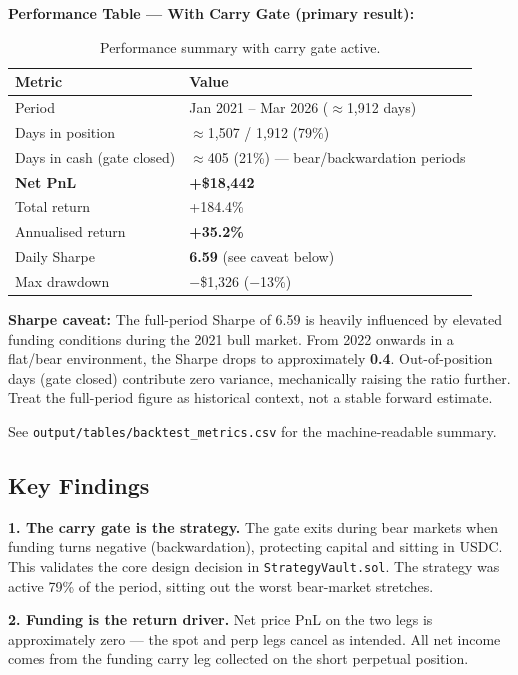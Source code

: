 \documentclass[11pt,a4paper]{article}
\begin{document}
\textbf{Performance Table --- With Carry Gate (primary result):}

\begin{table}[h!]
\centering
\caption{Performance summary with carry gate active.}
\begin{tabular}{@{}ll@{}}
\toprule
\textbf{Metric} & \textbf{Value} \\
\midrule
Period                       & Jan 2021 -- Mar 2026 ($\approx$1,912 days) \\
Days in position             & $\approx$1,507 / 1,912 (79\%) \\
Days in cash (gate closed)   & $\approx$405 (21\%) --- bear/backwardation periods \\
\textbf{Net PnL}             & \textbf{+\$18,442} \\
Total return                 & +184.4\% \\
Annualised return            & \textbf{+35.2\%} \\
Daily Sharpe                 & \textbf{6.59} (see caveat below) \\
Max drawdown                 & $-$\$1,326 ($-$13\%) \\
\bottomrule
\end{tabular}
\end{table}

\textbf{Sharpe caveat:} The full-period Sharpe of 6.59 is heavily influenced by elevated funding conditions during the 2021 bull market. From 2022 onwards in a flat/bear environment, the Sharpe drops to approximately \textbf{0.4}. Out-of-position days (gate closed) contribute zero variance, mechanically raising the ratio further. Treat the full-period figure as historical context, not a stable forward estimate.

See \texttt{output/tables/backtest\_metrics.csv} for the machine-readable summary.

\subsection{Key Findings}

\textbf{1. The carry gate is the strategy.} The gate exits during bear markets when funding turns negative (backwardation), protecting capital and sitting in USDC. This validates the core design decision in \texttt{StrategyVault.sol}. The strategy was active 79\% of the period, sitting out the worst bear-market stretches.

\textbf{2. Funding is the return driver.} Net price PnL on the two legs is approximately zero --- the spot and perp legs cancel as intended. All net income comes from the funding carry leg collected on the short perpetual position.
\end{document}
